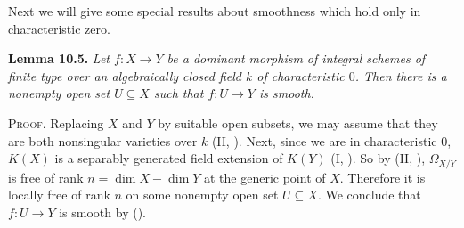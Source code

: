 {\medskip
Next we will give some special results about smoothness which hold only in characteristic zero.

\medskip
\noindent\hypertarget{result-III-10.5}{}\textbf{Lemma 10.5.} \emph{Let $f\colon X\to Y$ be a dominant morphism of integral schemes of finite type over an algebraically closed field $k$ of characteristic $0$. Then there is a nonempty open set $U\subseteq X$ such that $f\colon U\to Y$ is smooth.}

\smallskip
\noindent\textsc{Proof.} Replacing $X$ and $Y$ by suitable open subsets, we may assume that they are both nonsingular varieties over $k$ (II, ). Next, since we are in characteristic $0$, $K(X)$ is a separably generated field extension of $K(Y)$ (I, ). So by (II, ), $\Omega_{X/Y}$ is free of rank $n=\dim X-\dim Y$ at the generic point of $X$. Therefore it is locally free of rank $n$ on some nonempty open set $U\subseteq X$. We conclude that $f\colon U\to Y$ is smooth by ().}
